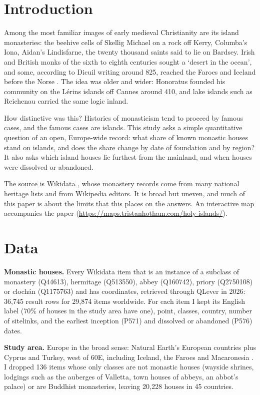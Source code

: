 \documentclass[11pt,a4paper]{article}
\begin{document}
\section{Introduction}
Among the most familiar images of early medieval Christianity are its island monasteries: the beehive cells of Skellig Michael on a rock off Kerry, Columba's Iona, Aidan's Lindisfarne, the twenty thousand saints said to lie on Bardsey. Irish and British monks of the sixth to eighth centuries sought a `desert in the ocean', and some, according to Dicuil writing around 825, reached the Faroes and Iceland before the Norse \citep{dicuil}. The idea was older and wider: Honoratus founded his community on the Lérins islands off Cannes around 410, and lake islands such as Reichenau carried the same logic inland.

How distinctive was this? Histories of monasticism tend to proceed by famous cases, and the famous cases are islands. This study asks a simple quantitative question of an open, Europe-wide record: what share of known monastic houses stand on islands, and does the share change by date of foundation and by region? It also asks which island houses lie furthest from the mainland, and when houses were dissolved or abandoned.

The source is Wikidata \citep{wikidata}, whose monastery records come from many national heritage lists and from Wikipedia editors. It is broad but uneven, and much of this paper is about the limits that this places on the answers. An interactive map accompanies the paper (\url{https://maps.tristanhotham.com/holy-islands/}).

\section{Data}
\textbf{Monastic houses.} Every Wikidata item that is an instance of a subclass of monastery (Q44613), hermitage (Q513550), abbey (Q160742), priory (Q2750108) or clochán (Q1175763) and has coordinates, retrieved through QLever \citep{qlever} in 2026: 36,745 result rows for 29,874 items worldwide. For each item I kept its English label (70\% of houses in the study area have one), point, classes, country, number of sitelinks, and the earliest inception (P571) and dissolved or abandoned (P576) dates.

\textbf{Study area.} Europe in the broad sense: Natural Earth's European countries plus Cyprus and Turkey, west of 60\textdegree{}E, including Iceland, the Faroes and Macaronesia \citep{naturalearth}. I dropped 136 items whose only classes are not monastic houses (wayside shrines, lodgings such as the auberges of Valletta, town houses of abbeys, an abbot's palace) or are Buddhist monasteries, leaving 20,228 houses in 45 countries.
\end{document}
